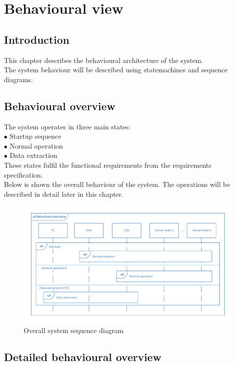\chapter{Behavioural view}

\section{Introduction}
This chapter describes the behavioural architecture of the system.\\
The system behaviour will be described using statemachines and sequence diagrams.\\

\section{Behavioural overview}
The system operates in three main states:\\
$\bullet$ Startup sequence\\
$\bullet$ Normal operation\\
$\bullet$ Data extraction\\
These states fulfil the functional requirements from the requirements specification.\\
Below is shown the overall behaviour of the system. The operations will be described in detail later in this chapter.
\begin{figure}
\centering
\includegraphics[width=1\textwidth]{billeder/behavioural_overview_SD}
\caption{Overall system sequence diagram}
\end{figure}

\section{Detailed behavioural overview}

